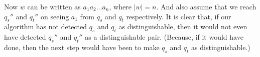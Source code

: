 \documentclass[english, 11pt]{article}
\begin{document}
\begin{figure}[htbp]
    \begin{subfigure}{0.45\textwidth}
        \begin{center}
            \label{fig:2sta1}
        \end{center}
    \end{subfigure}
    \hspace{1cm} %
    \begin{subfigure}{0.45\textwidth}
        \begin{center}
            \label{fig:2sta2}
        \end{center}
    \end{subfigure}
    \label{fig:2sta}
\end{figure}


Now $w$ can be written as $a_1a_2\dots a_n$, where $|w| = n$. And also assume that we reach $q_s''$ and $q_t''$ on seeing $a_1$ from $q_s$ and $q_t$ respectively. It is clear that, if our algorithm has not detected $q_s$ and $q_t$ as distinguishable, then it would not even have detected $q_s''$ and $q_t''$ as a distinguishable pair. (Because, if it would have done, then the next step would have been to make $q_s$ and $q_t$ as distinguishable.)
\end{document}
